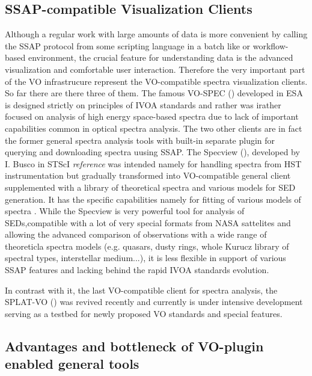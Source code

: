 \documentclass[final,authoryear,5p,times,twocolumn]{elsarticle}
\begin{document}
\subsection{SSAP-compatible  Visualization Clients}


Although a regular work with large amounts of data is more convenient by
calling the SSAP protocol from some scripting language in a batch like or
workflow-based environment, the crucial feature for understanding data is the
advanced visualization and comfortable user interaction.   Therefore the very
important part of the VO infrastrucure represent the VO-compatible spectra
visualization clients.  So far there are there three of them. The famous
VO-SPEC () developed in ESA is designed strictly on principles of IVOA standards
and rather was irather focused on analysis of high energy space-based spectra
due to lack of important capabilities common in optical spectra analysis.  The
two other clients are in fact the former general spectra  analysis tools with
built-in separate plugin for querying and downloading spectra uusing SSAP.  The
Specview (), developed by I. Busco in STScI {\it reference}  was  intended namely for
handling spectra from HST instrumentation but gradually transformed into
VO-compatible general client supplemented with a library of theoretical spectra
and various models for SED  generation.  It has the specific capabilities
namely for fitting of various models of spectra . While the Specview is very
powerful tool for analysis of SEDs,compatible with a lot of very special
formats from NASA sattelites and allowing the advanced comparison of
observations with a wide range of theoreticla spectra models  (e.g. quasars,
dusty rings, whole Kurucz library of spectral types, interstellar medium...),
it is less flexible in support of various SSAP features and lacking behind the
rapid IVOA standards evolution. 

In contrast with it, the last VO-compatible client for spectra analysis, the
SPLAT-VO () was revived recently and currently is under intensive development
serving as a testbed for newly proposed VO standards and special features. 

 



\subsection{Advantages and bottleneck of  VO-plugin enabled general tools}
\end{document}
